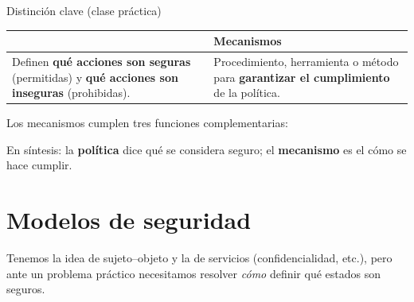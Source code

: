 \documentclass[11pt,a4paper]{article}
\begin{document}
\begin{practbox}{Distinción clave (clase práctica)}
\begin{center}
\renewcommand{\arraystretch}{1.3}
\begin{tabular}{>{\raggedright\arraybackslash}p{6.4cm} >{\raggedright\arraybackslash}p{6.4cm}}
\toprule
{\color{attackRed}\bfseries Políticas} & {\color{itbaCyanDark}\bfseries Mecanismos}\\
\midrule
Definen \textbf{qué acciones son seguras} (permitidas) y \textbf{qué acciones son inseguras}
(prohibidas). &
Procedimiento, herramienta o método para \textbf{garantizar el cumplimiento} de la política.\\
\bottomrule
\end{tabular}
\end{center}
\medskip
Los mecanismos cumplen tres funciones complementarias:
\begin{center}
\end{center}
\end{practbox}

\noindent En síntesis: la \textbf{política} dice qué se considera seguro; el
\textbf{mecanismo} es el cómo se hace cumplir.

\section{Modelos de seguridad}

Tenemos la idea de sujeto–objeto y la de servicios (confidencialidad, etc.), pero ante un
problema práctico necesitamos resolver \emph{cómo} definir qué estados son seguros.
\end{document}
